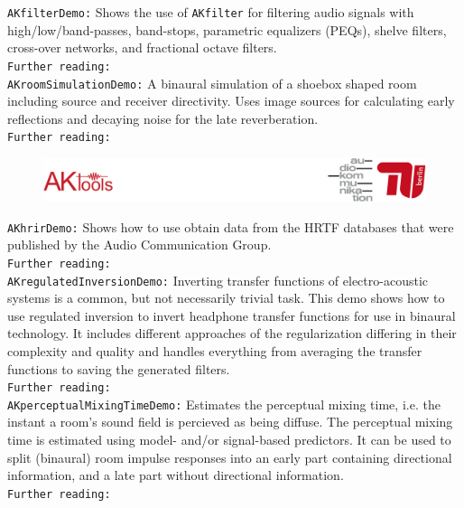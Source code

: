 \documentclass[11pt]{scrartcl}
\begin{document}
\noindent
{\color{tu_red}\texttt{AKfilterDemo:}} Shows the use of \texttt{AKfilter} for filtering audio signals with high/low/band-passes, band-stops, parametric equalizers (PEQs), shelve filters, cross-over networks, and fractional octave filters.\\
\texttt{Further reading:} \citet{Zoelzer2002, Bristow1994, Bohn2005}\\

\noindent
{\color{tu_red}\texttt{AKroomSimulationDemo:}} A binaural simulation of a shoebox shaped room including source and receiver directivity. Uses image sources for calculating early reflections and decaying noise for the late reverberation.\\
\texttt{Further reading:} \citet{Brinkmann2018}\\

\vfill
\begin{figure}[b!]
  \center
  \includegraphics[width=1\textwidth]{logo_footer}
\end{figure}

\clearpage

\noindent
{\color{tu_red}\texttt{AKhrirDemo:}} Shows how to use obtain data from the HRTF databases that were published by the Audio Communication Group.\\
\texttt{Further reading:} \citet{Brinkmann2015, fabian_hrtf_misc, Brinkmann2017c}\\

\noindent
{\color{tu_red}\texttt{AKregulatedInversionDemo:}} Inverting transfer functions of electro-acoustic systems is a common, but not necessarily trivial task. This demo shows how to use regulated inversion to invert headphone transfer functions for use in binaural technology. It includes different approaches of the regularization differing in their complexity and quality and handles everything from averaging the transfer functions to saving the generated filters.\\
\texttt{Further reading:} \citet{Kirkeby1999, Norcross2006, Scharer2009, Lindau2012}\\

\noindent
{\color{tu_red}\texttt{AKperceptualMixingTimeDemo:}} Estimates the perceptual mixing time, i.e.  the instant a room's sound field is percieved as being diffuse. The perceptual mixing time is estimated using model- and/or signal-based predictors. It can be used to split (binaural) room impulse responses into an early part containing directional information, and a late part without directional information.\\
\texttt{Further reading:} \citet{Lindau2012b, Abel2006}\\ 
\end{document}
